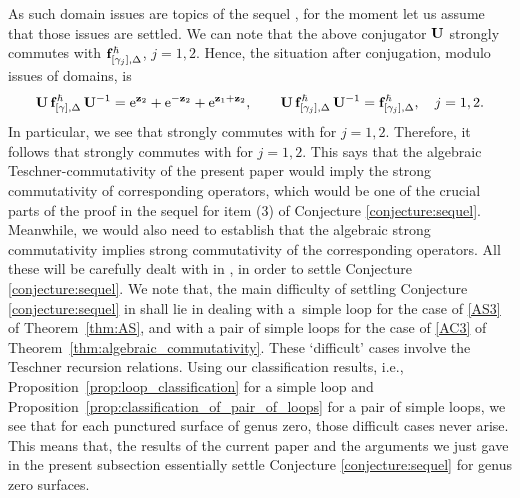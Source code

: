 \documentclass[pdftex]{sigma}
\numberwithin{equation}{section}
\theoremstyle{definition}
\begin{document}
As such domain issues are topics of the sequel \cite{sequel}, for the moment let us assume that those issues are settled. We can note that the above conjugator ${\bf U}$ strongly commutes with ${\bf f}^\hbar_{[\gamma_j],\Delta}$, $j=1,2$. Hence, the situation after conjugation, modulo issues of domains, is
\[
{\bf U} \, {\bf f}^\hbar_{[\gamma],\Delta} \, {\bf U}^{-1}
= {\rm e}^{{\bf z}_2} + {\rm e}^{-{\bf z}_2} + {\rm e}^{{\bf z}_1+{\bf z}_2}, \qquad
{\bf U} \, {\bf f}^\hbar_{[\gamma_j],\Delta} \, {\bf U}^{-1}
= {\bf f}^\hbar_{[\gamma_j],\Delta} , \quad j=1,2.
\]
In particular, we see that  strongly commutes with  for $j=1,2$. Therefore, it follows that  strongly commutes with  for $j=1,2$. This says that the algebraic Teschner-commutativity of the present paper would imply the strong commutativity of corresponding operators, which would be one of the crucial parts of the proof in the sequel \cite{sequel} for item (3) of Conjecture \ref{conjecture:sequel}. Meanwhile, we would also need to establish that the algebraic strong commutativity implies strong commutativity of the corresponding operators.
All these will be carefully dealt with in \cite{sequel}, in order to settle Conjecture \ref{conjecture:sequel}.
We note that, the main difficulty of settling Conjecture \ref{conjecture:sequel} in \cite{sequel} shall lie in dealing with a~simple loop for the case of \ref{AS3} of Theorem~\ref{thm:AS}, and with a pair of simple loops for the case of \ref{AC3} of Theorem~\ref{thm:algebraic_commutativity}. These `difficult' cases involve the Teschner recursion relations. Using our classification results, i.e., Proposition~\ref{prop:loop_classification} for a simple loop and Proposition~\ref{prop:classification_of_pair_of_loops} for a pair of simple loops, we see that for each punctured surface of genus zero, those difficult cases never arise. This means that, the results of the current paper and the arguments we just gave in the present subsection essentially settle Conjecture \ref{conjecture:sequel} for genus zero surfaces.
\end{document}
